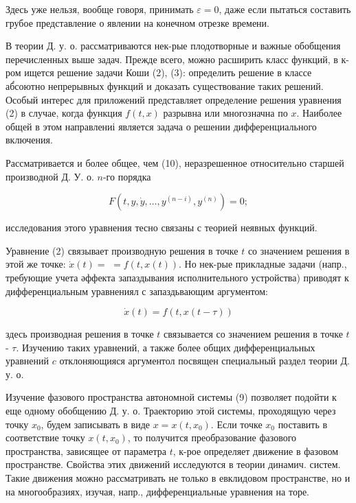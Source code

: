 \documentclass[10pt]{article}
\begin{document}
Здесь уже нельзя, вообще говоря, принимать $\varepsilon=0$, даже если пытаться составить грубое представление о явлении на конечном отрезке времени.



В теории Д. у. о. рассматриваются нек-рые плодотворные и важные обобщения перечисленных выше задач. Прежде всего, можно расширить класс функций, в к-ром ищется решение задачи Коши (2), (3): определить решение в классе аб́соютно непрерывных функций и доказать существование таких решений. Особый интерес для приложений представляет определение решения уравнения (2) в случае, когда функция $f(t, x)$ разрывна или многозначна по $x$. Наиболее общей в этом направлениі является задача о решении дифференциального включения.



Рассматривается и более общее, чем (10), неразрешенное относительно старшей производной Д. У. о. $n$-го порядка



\[

F\left(t, y, \dot{y}, \ldots, y^{(n-i)}, y^{(n)}\right)=0 ;

\]



исследования этого уравнения тесно связаны с теорией неявных функций.



Уравнение (2) связывает производную решения в точке $t$ со значением решения в этой же точке: $\dot{x}(t)=$ $=f(t, x(t))$. Но нек-рые прикладные задачи (напр., требующие учета әффекта запаздывания исполнительного устройства) приводят к дифференциальным уравнениял с запаздьвающим аргументом:



\[

\dot{x}(t)=f(t, x(t-\tau))

\]



здесь производная решения в точке $t$ связывается со значением решения в точке $t$ - $\tau$. Изучению таких уравнений, а также более общих дифференциальных уравнений $c$ отклоняющияся аргументол посвящен специальный раздел теории Д. у. о.



Изучение фазового пространства автономной системы (9) позволяет подойти к еще одному обобщению Д. у. о. Траекторию этой системы, проходящую через точку $x_{0}$, будем записывать в виде $x=x\left(t, x_{0}\right)$. Если точке $x_{0}$ поставить в соответствие точку $x\left(t, x_{0}\right)$, то получится преобразование фазового пространства, зависящее от параметра $t$, к-рое определяет движение в фазовом пространстве. Свойства этих движений исследуются в теории динамич. систем. Такие движения можно рассматривать не только в евклидовом пространстве, но и на многообразиях, изучая, напр., дифференциальные уравнения на торе.
\end{document}
